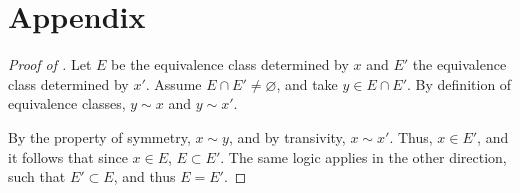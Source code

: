 \documentclass[12pt]{article}
\begin{document}
\section{Appendix}

\lemmaequivalence*
\begin{proof}[Proof of ]
  Let $E$ be the equivalence class determined by $x$ and $E'$ the equivalence class determined by $x'$. Assume $E \cap E' \neq \varnothing$, and take $y \in E \cap E'$. By definition of equivalence classes, $y \sim x$ and $y \sim x'$. 
  
  By the property of symmetry, $x \sim y$, and by transivity, $x \sim x'$. Thus, $x \in E'$, and it follows that since $x \in E$, $E \subset E'$. The same logic applies in the other direction, such that $E' \subset E$, and thus $E = E'$.
\end{proof}
\end{document}

